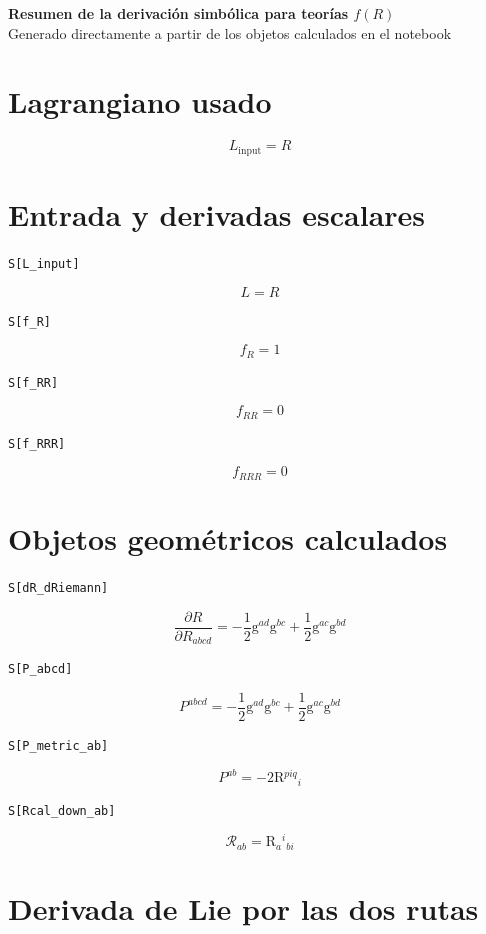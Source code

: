 \documentclass[11pt,a4paper]{article}
\begin{document}
\begin{center}
{\Large\bfseries Resumen de la derivación simbólica para teorías \(f(R)\)}\\[0.5em]
{\small Generado directamente a partir de los objetos calculados en el notebook}
\end{center}

\section*{Lagrangiano usado}
\[
\boxed{L_{\mathrm{input}} = R}
\]


\section*{Entrada y derivadas escalares}

\noindent\texttt{S[L\_input]}

\[
\boxed{L = R}
\]


\noindent\texttt{S[f\_R]}

\[
\boxed{f_R = 1}
\]


\noindent\texttt{S[f\_RR]}

\[
\boxed{f_{RR} = 0}
\]


\noindent\texttt{S[f\_RRR]}

\[
\boxed{f_{RRR} = 0}
\]


\section*{Objetos geométricos calculados}

\noindent\texttt{S[dR\_dRiemann]}

\[
\boxed{\dfrac{\partial R}{\partial R_{abcd}} = -\frac{1}{2}\mathrm{g}{}^{ad}\mathrm{g}{}^{bc} + \frac{1}{2}\mathrm{g}{}^{ac}\mathrm{g}{}^{bd}}
\]


\noindent\texttt{S[P\_abcd]}

\[
\boxed{P^{abcd} = -\frac{1}{2}\mathrm{g}{}^{ad}\mathrm{g}{}^{bc} + \frac{1}{2}\mathrm{g}{}^{ac}\mathrm{g}{}^{bd}}
\]


\noindent\texttt{S[P\_metric\_ab]}

\[
\boxed{P^{ab} = -2\mathrm{R}{}^{piq}{}_{i}}
\]


\noindent\texttt{S[Rcal\_down\_ab]}

\[
\boxed{\mathcal{R}_{ab} = \mathrm{R}{}_{a}{}^{i}{}_{bi}}
\]


\section*{Derivada de Lie por las dos rutas}
\end{document}
